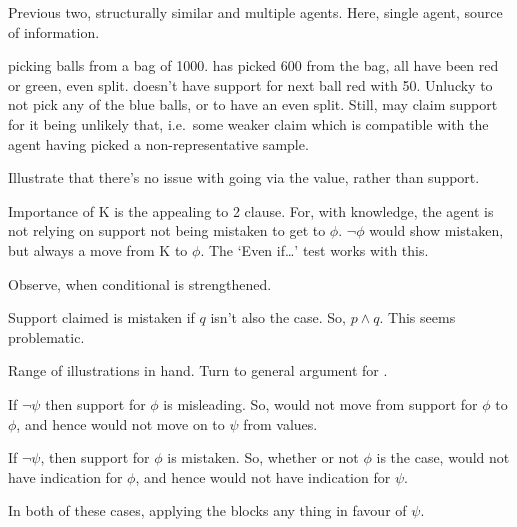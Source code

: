 \begin{note}
  Previous two, structurally similar and multiple agents.
  Here, single agent, source of information.
\end{note}

\begin{note}
   picking balls from a bag of 1000.
   has picked 600 from the bag, all have been red or green, even split.
   doesn't have support for next ball red with 50.
  Unlucky to not pick any of the blue balls, or to have an even split.
  Still, may claim support for it being unlikely that, i.e.\ some weaker claim which is compatible with the agent having picked a non-representative sample.
\end{note}

\begin{note}[K scenario]
  Illustrate that there's no issue with going via the value, rather than support.

  Importance of K is the appealing to 2 clause.
  For, with knowledge, the agent is not relying on support not being mistaken to get to \(\phi\).
  \(\lnot\phi\) would show mistaken, but always a move from K to \(\phi\).
  The `Even if\dots' test works with this.
\end{note}

\begin{note}
  Observe, when conditional is strengthened.

  Support claimed is mistaken if \(q\) isn't also the case.
  So, \(p \land q\).
  This seems problematic.
\end{note}


\newpage

\begin{note}
  Range of illustrations in hand.
  Turn to general argument for \nI{}.
\end{note}


\begin{note}

  If \(\lnot\psi\) then support for \(\phi\) is misleading.
  So, would not move from support for \(\phi\) to \(\phi\), and hence would not move on to \(\psi\) from values.


  If \(\lnot\psi\), then support for \(\phi\) is mistaken.
  So, whether or not \(\phi\) is the case, would not have indication for \(\phi\), and hence would not have indication for \(\psi\).

  In both of these cases, applying the \eit{} blocks any thing in favour of \(\psi\).
  
\end{note}

